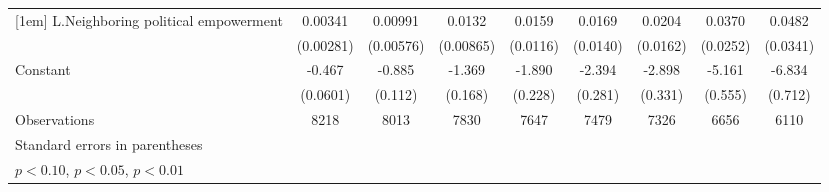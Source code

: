 \begin{table}[htbp]
\begin{tabular}{l*{8}{c}}
[1em]
L.Neighboring political empowerment&     0.00341         &     0.00991\sym{*}  &      0.0132         &      0.0159         &      0.0169         &      0.0204         &      0.0370         &      0.0482         \\
                    &   (0.00281)         &   (0.00576)         &   (0.00865)         &    (0.0116)         &    (0.0140)         &    (0.0162)         &    (0.0252)         &    (0.0341)         \\
[1em]
Constant            &      -0.467\sym{***}&      -0.885\sym{***}&      -1.369\sym{***}&      -1.890\sym{***}&      -2.394\sym{***}&      -2.898\sym{***}&      -5.161\sym{***}&      -6.834\sym{***}\\
                    &    (0.0601)         &     (0.112)         &     (0.168)         &     (0.228)         &     (0.281)         &     (0.331)         &     (0.555)         &     (0.712)         \\
\hline
Observations        &        8218         &        8013         &        7830         &        7647         &        7479         &        7326         &        6656         &        6110         \\
\hline\hline
\multicolumn{9}{l}{\footnotesize Standard errors in parentheses}\\
\multicolumn{9}{l}{\footnotesize \sym{*} \(p<0.10\), \sym{**} \(p<0.05\), \sym{***} \(p<0.01\)}\\
\end{tabular}
\end{table}
